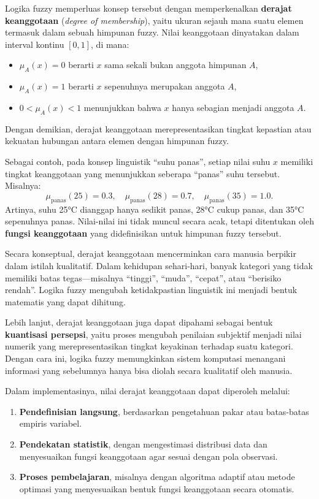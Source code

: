 \documentclass[12pt,a4paper]{article}
\theoremstyle{remark}
\begin{document}
Logika fuzzy memperluas konsep tersebut dengan memperkenalkan \textbf{derajat keanggotaan} (\textit{degree of membership}), yaitu ukuran sejauh mana suatu elemen termasuk dalam sebuah himpunan fuzzy. Nilai keanggotaan dinyatakan dalam interval kontinu \([0,1]\), di mana:
\begin{itemize}
    \item \(\mu_A(x) = 0\) berarti \(x\) sama sekali bukan anggota himpunan \(A\),
    \item \(\mu_A(x) = 1\) berarti \(x\) sepenuhnya merupakan anggota \(A\),
    \item \(0 < \mu_A(x) < 1\) menunjukkan bahwa \(x\) hanya sebagian menjadi anggota \(A\).
\end{itemize}
Dengan demikian, derajat keanggotaan merepresentasikan tingkat kepastian atau kekuatan hubungan antara elemen dengan himpunan fuzzy.

Sebagai contoh, pada konsep linguistik “suhu panas”, setiap nilai suhu \(x\) memiliki tingkat keanggotaan yang menunjukkan seberapa “panas” suhu tersebut. Misalnya:
\[
    \mu_{\text{panas}}(25) = 0.3, \quad
    \mu_{\text{panas}}(28) = 0.7, \quad
    \mu_{\text{panas}}(35) = 1.0.
\]
Artinya, suhu 25°C dianggap hanya sedikit panas, 28°C cukup panas, dan 35°C sepenuhnya panas. Nilai-nilai ini tidak muncul secara acak, tetapi ditentukan oleh \textbf{fungsi keanggotaan} yang didefinisikan untuk himpunan fuzzy tersebut.

Secara konseptual, derajat keanggotaan mencerminkan cara manusia berpikir dalam istilah kualitatif. Dalam kehidupan sehari-hari, banyak kategori yang tidak memiliki batas tegas—misalnya “tinggi”, “muda”, “cepat”, atau “berisiko rendah”. Logika fuzzy mengubah ketidakpastian linguistik ini menjadi bentuk matematis yang dapat dihitung.

Lebih lanjut, derajat keanggotaan juga dapat dipahami sebagai bentuk \textbf{kuantisasi persepsi}, yaitu proses mengubah penilaian subjektif menjadi nilai numerik yang merepresentasikan tingkat keyakinan terhadap suatu kategori. Dengan cara ini, logika fuzzy memungkinkan sistem komputasi menangani informasi yang sebelumnya hanya bisa diolah secara kualitatif oleh manusia.

Dalam implementasinya, nilai derajat keanggotaan dapat diperoleh melalui:
\begin{enumerate}
    \item \textbf{Pendefinisian langsung}, berdasarkan pengetahuan pakar atau batas-batas empiris variabel.
    \item \textbf{Pendekatan statistik}, dengan mengestimasi distribusi data dan menyesuaikan fungsi keanggotaan agar sesuai dengan pola observasi.
    \item \textbf{Proses pembelajaran}, misalnya dengan algoritma adaptif atau metode optimasi yang menyesuaikan bentuk fungsi keanggotaan secara otomatis.
\end{enumerate}
\end{document}
